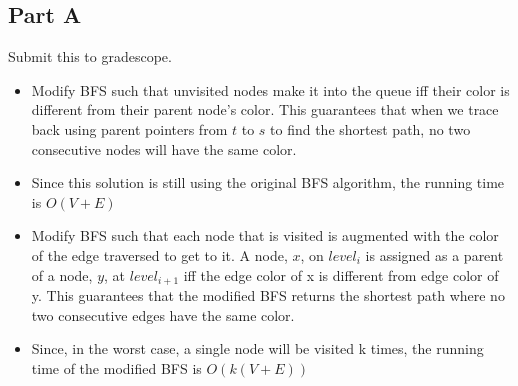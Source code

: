 \documentclass[12pt,twoside]{article}
\begin{document}

\begin{problems}

\section*{Part A}

\problem  %
Submit this to gradescope.

\begin{problemparts}
\problempart
\begin{itemize}
	\item Modify BFS such that unvisited nodes make it into the queue iff their color is different from their parent node's color. This guarantees that when we trace back using parent pointers from $ t $ to $ s $ to find the shortest path, no two consecutive nodes will have the same color.
	\item Since this solution is still using the original BFS algorithm, the running time is $ O(V+E) $ 
\end{itemize}
\problempart
\begin{itemize}
	\item Modify BFS such that each node that is visited is augmented with the color of the edge traversed to get to it. A node, $ x $, on $ level_{i} $ is assigned as a parent of a node, $ y $, at $ level_{i+1} $ iff the edge color of x is different from edge color of y. This guarantees that the modified BFS returns the shortest path where no two consecutive edges have the same color. 
	\item Since, in the worst case, a single node will be visited k times, the running time of the modified BFS is  $ O(k(V+E)) $
\end{itemize}
\end{problemparts}


\end{problems}
\end{document}
